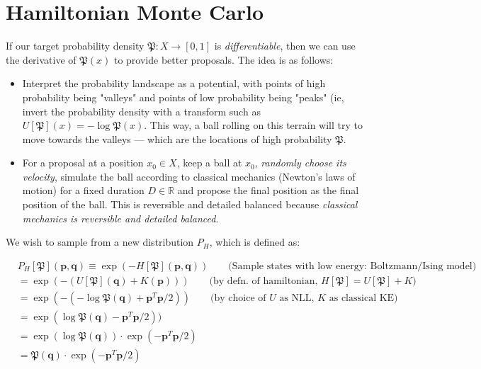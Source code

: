 \documentclass[titlepage]{article}
\newcommand{\R}{\mathbb{R}}
\newcommand{\p}{\mathbf{p}}
\newcommand{\q}{\mathbf{q}}
\renewcommand{\P}{\mathfrak{P}}
\begin{document}
\section{Hamiltonian Monte Carlo}

If our target probability density $\P: X \rightarrow [0, 1]$ is \emph{differentiable},
then we can use the derivative of $\P(x)$ to provide better proposals. The idea
is as follows:

\begin{itemize}
    \item Interpret the probability landscape as a potential, with
        points of high probability being "valleys" and points of low probability
        being "peaks" (ie, invert the probability density with a transform
        such as $U[\P](x) = -\log \P(x)$. This way, a ball rolling on this
        terrain will try to move towards the valleys --- which are the locations
        of high probability $\P$.
    \item For a proposal at a position $x_0 \in X$, keep a ball at $x_0$,
        \emph{randomly choose its velocity}, simulate the ball according to 
        classical mechanics (Newton's laws of motion) for a fixed duration $D \in \R$
        and propose the final position as the final position of the ball. This
        is reversible and detailed balanced because 
        \emph{classical mechanics is reversible and detailed balanced}.
\end{itemize}


We wish to sample from a new distribution $P_H$, which is defined as:

\begin{align*}
&P_H[\P](\p, \q) \equiv \exp(-H[\P](\p, \q)) \qquad \text{(Sample states with low energy: Boltzmann/Ising model)}\\
&= \exp(-(U[\P](\q) + K(\p))) \qquad \text{(by defn. of hamiltonian, $H[\P] = U[\P] + K$)}\\
&= \exp(-(-\log \P(\q) + \p^T \p/2)) \qquad \text{(by choice of $U$ as NLL, $K$ as classical KE)}\\
&= \exp(\log \P(\q) - \p^T \p/2)) \\
&= \exp(\log \P(\q)) \cdot \exp(-\p^T \p/2) \\
&= \P(\q) \cdot \exp(-\p^T \p/2) \\
\end{align*}
\end{document}

